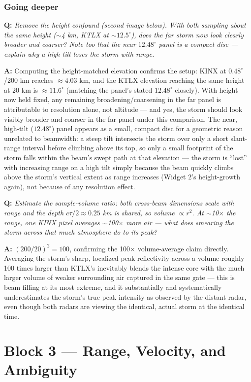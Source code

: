 \documentclass[11pt]{article}
\newenvironment{qa}[1]{\par\noindent\textbf{\color{qgray}Q: }\emph{#1}\par\noindent\textbf{A: }}{\par\vspace{6pt}}
\newcommand{\tier}[1]{\subsubsection*{#1}}
\begin{document}
\tier{Going deeper}
\begin{qa}{Remove the height confound (second image below). With both sampling about the same height ($\sim$4 km, KTLX at $\sim12.5^\circ$), does the far storm now look clearly broader and coarser? Note too that the near $12.48^\circ$ panel is a compact disc --- explain why a high tilt loses the storm with range.}
Computing the height-matched elevation confirms the setup: KINX at $0.48^\circ$/200 km reaches $\approx4.03$ km, and the KTLX elevation reaching the same height at 20 km is $\approx11.6^\circ$ (matching the panel's stated $12.48^\circ$ closely). With height now held fixed, any remaining broadening/coarsening in the far panel is attributable to resolution alone, not altitude --- and yes, the storm should look visibly broader and coarser in the far panel under this comparison. The near, high-tilt ($12.48^\circ$) panel appears as a small, compact disc for a geometric reason unrelated to beamwidth: a steep tilt intersects the storm over only a short slant-range interval before climbing above its top, so only a small footprint of the storm falls within the beam's swept path at that elevation --- the storm is ``lost'' with increasing range on a high tilt simply because the beam quickly climbs above the storm's vertical extent as range increases (Widget 2's height-growth again), not because of any resolution effect.
\end{qa}
\begin{qa}{Estimate the sample-volume ratio: both cross-beam dimensions scale with range and the depth $c\tau/2\approx0.25$ km is shared, so volume $\propto r^2$. At $\sim$10$\times$ the range, one KINX pixel averages $\sim$100$\times$ more air --- what does smearing the storm across that much atmosphere do to its peak?}
$(200/20)^2=100$, confirming the 100$\times$ volume-average claim directly. Averaging the storm's sharp, localized peak reflectivity across a volume roughly 100 times larger than KTLX's inevitably blends the intense core with the much larger volume of weaker surrounding air captured in the same gate --- this is beam filling at its most extreme, and it substantially and systematically underestimates the storm's true peak intensity as observed by the distant radar, even though both radars are viewing the identical, actual storm at the identical time.
\end{qa}
\clearpage
\section{Block 3 --- Range, Velocity, and Ambiguity}
\end{document}
